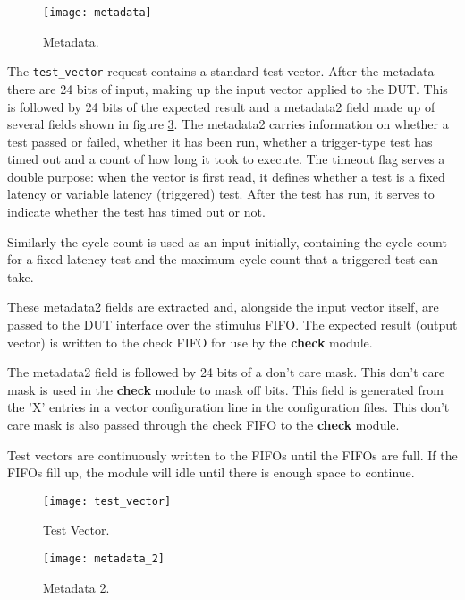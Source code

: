 \begin{figure}[h]
 \centering
 \texttt{[image: metadata]}
 \caption{Metadata.}
 \label{fig:req_metadata}
\end{figure}

The \texttt{test\_vector} request contains a standard test vector. After the metadata there are 24 bits of input, making up
the input vector applied to the DUT. This is followed by 24 bits of the expected result and a metadata2 field made up of
several fields shown in figure \ref{fig:req_metadata_2}. The metadata2 carries information on whether a test passed or failed,
whether it has been run, whether a trigger-type test has timed out and a count of how long it took to execute.
The timeout flag serves a double purpose: when the vector is first read, it defines whether a test
is a fixed latency or variable latency (triggered) test. After the test has run, it serves to indicate whether the test has timed out or not.

Similarly the cycle count is used as an input initially, containing the cycle count for a fixed latency test and the maximum cycle
count that a triggered test can take.

These metadata2 fields are extracted and, alongside the input vector itself, are passed to the DUT interface over the stimulus FIFO.
The expected result (output vector) is written to the check FIFO for use by the \textbf{check} module.

The metadata2 field is followed by 24 bits of a don't care mask. This don't care mask is used in the \textbf{check} module to
mask off bits. This field is generated from the 'X' entries in a vector configuration line in the configuration files. This don't care
mask is also passed through the check FIFO to the \textbf{check} module.

Test vectors are continuously written to the FIFOs until the FIFOs are full. If the FIFOs fill up, the module will idle
until there is enough space to continue.

\begin{figure}[h]
 \centering
 \texttt{[image: test\_vector]}
 \caption{Test Vector.}
 \label{fig:req_test_vector}
\end{figure}

\begin{figure}[h]
 \centering
 \texttt{[image: metadata\_2]}
 \caption{Metadata 2.}
 \label{fig:req_metadata_2}
\end{figure}


